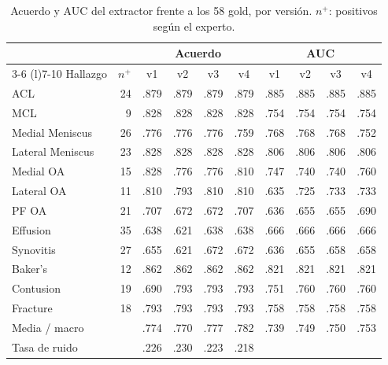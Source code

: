 \begin{table}[t]
  \caption{Acuerdo y AUC del extractor frente a los 58 gold, por versión. $n^{+}$: positivos según el experto.}
  \label{tab:ext-versiones}
  \centering
  \small
  \begin{tabular}{@{}lrcccccccc@{}}
    \toprule
    & & \multicolumn{4}{c}{Acuerdo} & \multicolumn{4}{c}{AUC} \\
    \cmidrule(lr){3-6} \cmidrule(l){7-10}
    Hallazgo & $n^{+}$ & v1 & v2 & v3 & v4 & v1 & v2 & v3 & v4 \\
    \midrule
    ACL              & 24 & .879 & .879 & .879 & .879 & .885 & .885 & .885 & .885 \\
    MCL              &  9 & .828 & .828 & .828 & .828 & .754 & .754 & .754 & .754 \\
    Medial Meniscus  & 26 & .776 & .776 & .776 & .759 & .768 & .768 & .768 & .752 \\
    Lateral Meniscus & 23 & .828 & .828 & .828 & .828 & .806 & .806 & .806 & .806 \\
    Medial OA        & 15 & .828 & .776 & .776 & .810 & .747 & .740 & .740 & .760 \\
    Lateral OA       & 11 & .810 & .793 & .810 & .810 & .635 & .725 & .733 & .733 \\
    PF OA            & 21 & .707 & .672 & .672 & .707 & .636 & .655 & .655 & .690 \\
    Effusion         & 35 & .638 & .621 & .638 & .638 & .666 & .666 & .666 & .666 \\
    Synovitis        & 27 & .655 & .621 & .672 & .672 & .636 & .655 & .658 & .658 \\
    Baker's          & 12 & .862 & .862 & .862 & .862 & .821 & .821 & .821 & .821 \\
    Contusion        & 19 & .690 & .793 & .793 & .793 & .751 & .760 & .760 & .760 \\
    Fracture         & 18 & .793 & .793 & .793 & .793 & .758 & .758 & .758 & .758 \\
    \midrule
    Media / macro    &    & .774 & .770 & .777 & .782 & .739 & .749 & .750 & .753 \\
    Tasa de ruido    &    & .226 & .230 & .223 & .218 &      &      &      &      \\
    \bottomrule
  \end{tabular}
\end{table}

